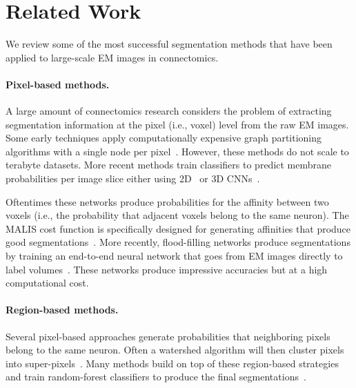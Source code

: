 
\section{Related Work}

We review some of the most successful segmentation methods that have been applied to large-scale EM images in connectomics.

\paragraph{Pixel-based methods.}
A large amount of connectomics research considers the problem of extracting segmentation information at the pixel (i.e., voxel) level from the raw EM images. Some early techniques apply computationally expensive graph partitioning algorithms with a single node per pixel~\cite{andres2012globally}. However, these methods do not scale to terabyte datasets. More recent methods train classifiers to predict membrane probabilities per image slice either using 2D~\cite{ciresan2012deep,jain2010boundary,kaynig2015large,seymour2016rhoananet,amelio_segmentation} or 3D CNNs~\cite{lee2015recursive,ronneberger2015u,turaga2010convolutional}.

Oftentimes these networks produce probabilities for the affinity between two voxels (i.e., the probability that adjacent voxels belong to the same neuron). The MALIS cost function is specifically designed for generating affinities that produce good segmentations~\cite{briggman2009maximin}. More recently, flood-filling networks produce segmentations by training an end-to-end neural network that goes from EM images directly to label volumes~\cite{januszewski2016flood}. These networks produce impressive accuracies but at a high computational cost.

\paragraph{Region-based methods.}
Several pixel-based approaches generate probabilities that neighboring pixels belong to the same neuron.
Often a watershed algorithm will then cluster pixels into super-pixels~\cite{zlateski2015image}.
Many methods build on top of these region-based strategies and train random-forest classifiers to produce the final segmentations~\cite{seymour2016rhoananet,nunez2014graph,10.1371/journal.pone.0125825,parag2017anisotropic,zlateski2015image}.


